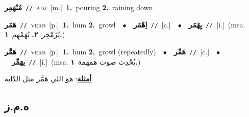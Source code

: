 \documentclass[10pt,a4paper,twoside]{article} %
\begin{document}
\begin{multicols}{2}
{\setlength\topsep{0pt}\textbf{\foreignlanguage{arabic}{مُنْهَمِر}}\ {\color{gray}\texttt{//}\color{black}}\ \textsc{adj}\ [m.]\ \textbf{1.}~pouring  \textbf{2.}~raining down\ } \vspace{2mm}

{\setlength\topsep{0pt}\textbf{\foreignlanguage{arabic}{هَمَر}}\ {\color{gray}\texttt{//}\color{black}}\ \textsc{verb}\ [p.]\ \textbf{1.}~hum  \textbf{2.}~growl\ \ $\bullet$\ \ \setlength\topsep{0pt}\textbf{\foreignlanguage{arabic}{اِهْمَر}}\ {\color{gray}\texttt{//}\color{black}}\ [c.]\ \ $\bullet$\ \ \setlength\topsep{0pt}\textbf{\foreignlanguage{arabic}{يِهْمَر}}\ {\color{gray}\texttt{//}\color{black}}\ [i.]\ \color{gray}(msa. \foreignlanguage{arabic}{يُزَمْجِر}~\foreignlanguage{arabic}{\textbf{٢.}}  \foreignlanguage{arabic}{يُهَمْهِم}~\foreignlanguage{arabic}{\textbf{١.}})\color{black}\ } \vspace{2mm}

{\setlength\topsep{0pt}\textbf{\foreignlanguage{arabic}{هَمَّر}}\ {\color{gray}\texttt{//}\color{black}}\ \textsc{verb}\ [p.]\ \textbf{1.}~hum  \textbf{2.}~growl (repeatedly)\ \ $\bullet$\ \ \setlength\topsep{0pt}\textbf{\foreignlanguage{arabic}{هَمِّر}}\ {\color{gray}\texttt{//}\color{black}}\ [c.]\ \ $\bullet$\ \ \setlength\topsep{0pt}\textbf{\foreignlanguage{arabic}{يهَمِّر}}\ {\color{gray}\texttt{//}\color{black}}\ [i.]\ \color{gray}(msa. \foreignlanguage{arabic}{يُحْدِث صوت همهمة}~\foreignlanguage{arabic}{\textbf{١.}})\color{black}\  \begin{flushright}\color{gray}\foreignlanguage{arabic}{\textbf{\underline{\foreignlanguage{arabic}{أمثلة}}}: هو اللي هَمَّر مثل الدّابة}\end{flushright}\color{black}} \vspace{2mm}

\vspace{-3mm}
\subsection*{\color{blue}\foreignlanguage{arabic}{ه.م.ز}\color{blue}{}} 


\end{multicols}
\end{document}
